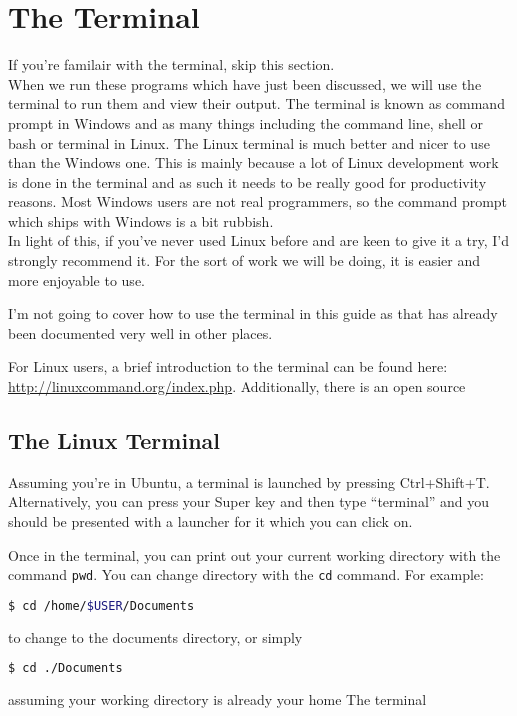 \chapter{The Terminal}
If you're familair with the terminal, skip this section.\\

When we run these programs which have just been discussed, we will use the terminal to run them and view their output. 
The terminal is known as command prompt in Windows and as many things including the command line, shell or bash or terminal in Linux.
The Linux terminal is much better and nicer to use than the Windows one. This is mainly because a lot of Linux development work is done in the terminal and as such it needs to be really good for productivity reasons. Most Windows users are not real programmers, so the command prompt which ships with Windows is a bit rubbish. \\

In light of this, if you've never used Linux before and are keen to give it a try, I'd strongly recommend it. For the sort of work we will be doing, it is easier and more enjoyable to use.

I'm not going to cover how to use the terminal in this guide as that has already been documented very well in other places.

For Linux users, a brief introduction to the terminal can be found here: \url{http://linuxcommand.org/index.php}. Additionally, there is an open source 

\section{The Linux Terminal}
Assuming you're in Ubuntu, a terminal is launched by pressing Ctrl+Shift+T. Alternatively, you can press your Super key and then type ``terminal'' and you should be presented with a launcher for it which you can click on.

Once in the terminal, you can print out your current working directory with the command \texttt{pwd}. You can change directory with the \texttt{cd} command. For example:
\begin{lstlisting}[language=bash]
  $ cd /home/$USER/Documents
\end{lstlisting} 
to change to the documents directory, or simply 
\begin{lstlisting}[language=bash]
  $ cd ./Documents
\end{lstlisting} 
assuming your working directory is already your home The terminal 

